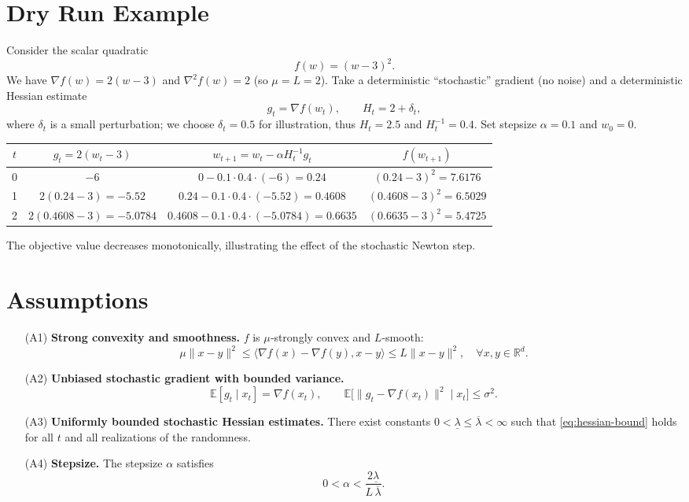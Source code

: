 \documentclass{article}
\newcommand{\E}{\mathbb{E}}
\newcommand{\R}{\mathbb{R}}
\begin{document}
\section*{Dry Run Example}
Consider the scalar quadratic
\[
f(w)=(w-3)^{2}.
\]
We have $\nabla f(w)=2(w-3)$ and $\nabla^{2}f(w)=2$ (so $\mu=L=2$).  
Take a deterministic “stochastic” gradient (no noise) and a deterministic Hessian estimate
\[
g_{t}= \nabla f(w_{t}),\qquad H_{t}=2+\delta_{t},
\]
where $\delta_{t}$ is a small perturbation; we choose $\delta_{t}=0.5$ for illustration, thus
$H_{t}=2.5$ and $H_{t}^{-1}=0.4$.
Set stepsize $\alpha=0.1$ and $w_{0}=0$.

\begin{center}
\begin{tabular}{c|c|c|c}
$t$ & $g_{t}=2(w_{t}-3)$ & $w_{t+1}=w_{t}-\alpha H_{t}^{-1}g_{t}$ & $f(w_{t+1})$\\\hline
0 & $-6$ & $0-0.1\cdot0.4\cdot(-6)=0.24$ & $(0.24-3)^{2}=7.6176$\\
1 & $2(0.24-3)=-5.52$ & $0.24-0.1\cdot0.4\cdot(-5.52)=0.4608$ & $(0.4608-3)^{2}=6.5029$\\
2 & $2(0.4608-3)=-5.0784$ & $0.4608-0.1\cdot0.4\cdot(-5.0784)=0.6635$ & $(0.6635-3)^{2}=5.4725$\\
\end{tabular}
\end{center}
The objective value decreases monotonically, illustrating the effect of the stochastic Newton step.

\newpage
\section*{Assumptions}
\begin{enumerate}
\item[(A1)] \textbf{Strong convexity and smoothness.} $f$ is $\mu$‑strongly convex and $L$‑smooth:
\[
\mu\|x-y\|^{2} \le \langle \nabla f(x)-\nabla f(y),x-y\rangle \le L\|x-y\|^{2},
\quad\forall x,y\in\R^{d}.
\]

\item[(A2)] \textbf{Unbiased stochastic gradient with bounded variance.}
\[
\E[g_{t}\mid x_{t}]=\nabla f(x_{t}),\qquad 
\E\big[\|g_{t}-\nabla f(x_{t})\|^{2}\mid x_{t}\big]\le\sigma^{2}.
\]

\item[(A3)] \textbf{Uniformly bounded stochastic Hessian estimates.}
There exist constants $0<\underline{\lambda}\le \overline{\lambda}<\infty$ such that
\eqref{eq:hessian-bound} holds for all $t$ and all realizations of the randomness.

\item[(A4)] \textbf{Stepsize.} The stepsize $\alpha$ satisfies
\[
0<\alpha<\frac{2\underline{\lambda}}{L\,\overline{\lambda}}.
\]
\end{enumerate}
\end{document}
